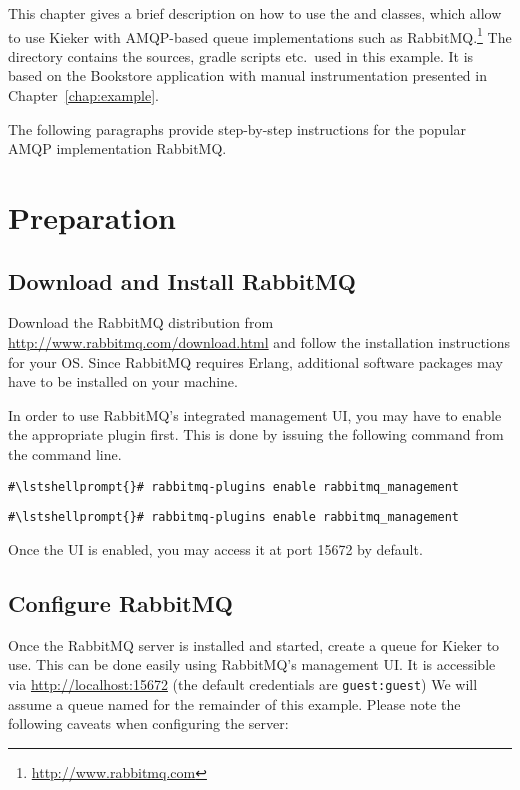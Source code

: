 This chapter gives a brief description on how to use the  and  %
classes, which allow to use Kieker with AMQP-based queue implementations such as %
RabbitMQ.\footnote{\url{http://www.rabbitmq.com}} The directory \dir{\AMQPBookstoreApplicationReleaseDirDistro/} %
contains the sources, gradle scripts etc.\ used in this example. It is based on the Bookstore %
application with manual instrumentation presented in Chapter~\ref{chap:example}. %

The following paragraphs provide step-by-step instructions for the popular AMQP implementation RabbitMQ.%

\section{Preparation}

\subsection{Download and Install RabbitMQ}
Download the RabbitMQ distribution from \url{http://www.rabbitmq.com/download.html} and follow the installation %
instructions for your OS. Since RabbitMQ requires Erlang, additional software packages may have to be installed %
on your machine.
\par In order to use RabbitMQ's integrated management UI, you may have to enable the appropriate plugin first. This is %
done by issuing the following command from the command line. 

\setBashListing
\begin{lstlisting}[caption=Enable the management UI under UNIX-like systems]
#\lstshellprompt{}# rabbitmq-plugins enable rabbitmq_management
\end{lstlisting}
\begin{lstlisting}[caption=Enable the management UI under Windows]
#\lstshellprompt{}# rabbitmq-plugins enable rabbitmq_management
\end{lstlisting}

Once the UI is enabled, you may access it at port 15672 by default. %

\subsection{Configure RabbitMQ}
Once the RabbitMQ server is installed and started, create a queue for Kieker to use. This can be done easily using %
RabbitMQ's management UI. It is accessible via \url{http://localhost:15672} (the default credentials are \texttt{guest:guest}) We will assume a queue named  for the remainder of this %
example. Please note the following caveats when configuring the server:

